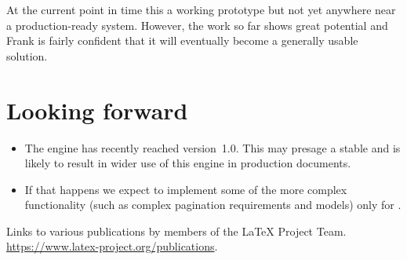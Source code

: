 \documentclass{ltnews}
\begin{document}
At the current point in time this a working prototype but not yet anywhere near
a production-ready system. However, the work so far shows great potential and
Frank is fairly confident that it will eventually become a generally usable
solution.

\section{Looking forward}

\begin{itemize}
  \item The  engine has recently reached version~1.0. This may
    presage a stable  and is likely to result in
    wider use of this engine in production documents.
  \item If that happens we expect to implement some of the more complex
    functionality (such as complex pagination requirements and models) only for
    .
\end{itemize}

\begin{thebibliography}{10}
  \raggedright
    Links to various publications by members of the \LaTeX{} Project Team.
    \newblock \url{https://www.latex-project.org/publications}.
\end{thebibliography}
\end{document}
